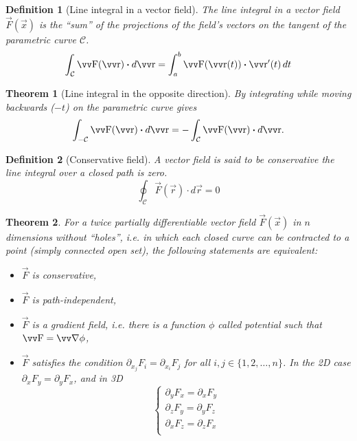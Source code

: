 \documentclass[twocolumn, margin=small]{tex/hsrzf}
\theoremstyle{fuvarzf}
\newtheorem{theorem}{Theorem}
\newtheorem{definition}{Definition}
\begin{document}
\begin{definition}[Line integral in a vector field]
  The line integral in a vector field \(\vec{F}(\vec{x})\) is the ``sum'' of
  the projections of the field's vectors on the tangent of the parametric curve
  \(\mathcal{C}\).
  \[
    \int_\mathcal{C} \vec{F}(\vec{r})\dotp d\vec{r}
    = \int_a^b \vec{F}(\vec{r}(t))\dotp \vec{r}'(t) \,dt
  \]
\end{definition}

\begin{theorem}[Line integral in the opposite direction]
  By integrating while moving backwards (\(-t\)) on the parametric curve gives
  \[
    \int_{-\mathcal{C}} \vec{F}(\vec{r})\dotp d\vec{r}
    = -\int_{\mathcal{C}} \vec{F}(\vec{r})\dotp d\vec{r} .
  \]
\end{theorem}

\begin{definition}[Conservative field]
  A vector field is said to be \emph{conservative} the line integral over a
  closed path is zero.
  \[
    \oint_\mathcal{C} \vec{F}(\vec{r})\cdot d\vec{r} = 0
  \]
\end{definition}

\begin{theorem}
  For a twice partially differentiable vector field \(\vec{F}(\vec{x})\) in
  \(n\) dimensions without ``holes'', i.e. in which each closed curve can be
  contracted to a point (simply connected open set), the following statements
  are equivalent:
  \begin{itemize}
    \item \(\vec{F}\) is conservative,
    \item \(\vec{F}\) is path-independent,
    \item \(\vec{F}\) is a \emph{gradient field}, i.e. there is a
      function \(\phi\) called \emph{potential} such that \(\vec{F} = \grad
      \phi\),
    \item \(\vec{F}\) satisfies the condition \(\partial_{x_j} F_i =
      \partial_{x_i} F_j\) for all \(i,j \in \{1,2,\ldots,n\}\). In the 2D case
      \(\partial_x F_y = \partial_y F_x\), and in 3D
      \[
        \begin{cases}
          \partial_y F_x = \partial_x F_y \\
          \partial_z F_y = \partial_y F_z \\
          \partial_x F_z = \partial_z F_x \\
        \end{cases}
      \]
  \end{itemize}
\end{theorem}
\end{document}
